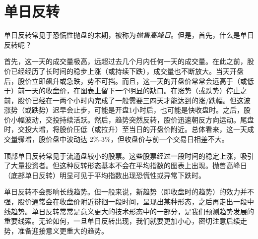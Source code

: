 \section{单日反转}
单日反转常见于恐慌性抛盘的末期，被称为\textit{抛售高峰日}。但是，首先，什么是单日反转呢？

\begin{tcolorbox}
    首先，这一天的成交量极高，远超过去几个月内任何一天的成交量。在此之前，股价已经经历了长时间的稳步上涨（或持续下跌），成交量也不断放大。当天开盘后，股价立即飙升或急跌，势不可挡。而且，这一天的开盘价常常会远高于（或低于）前一天的收盘价，在图表上留下一个明显的缺口。在涨势（或跌势）停止之前，股价已经在一两个小时内完成了一般需要三四天才能达到的涨/跌幅。但这波涨势（或跌势）迟早会止步，可能是开盘1小时后，也可能是快收盘时。之后，股价小幅波动，交投持续活跃。然后，趋势突然反转，股价迅速朝反方向运动。尾盘时，交投大增，将股价压低（或拉升）至当日的开盘价附近。总体看来，这一天成交量骤增，股价盘中波动达 2\%-3\%，但收盘价与前一个交易日相差不大。
\end{tcolorbox}

顶部单日反转常见于流通盘较小的股票。这些股票经过一段时间的稳定上涨，吸引了大量投资者。但这种反转形态基本不会在平均指数的图表上出现。抛售高峰日（底部单日反转）明显可见于平均指数出现恐慌性或异常下跌时。

单日反转不会影响长线趋势。但一般来说，新趋势（即收盘时的趋势）的效力并不强，股价通常会在收盘价附近徘徊一段时间，呈现出某种形态，之后再走出一段中线趋势。单日反转常常是意义更大的技术形态中的一部分，是我们预测趋势发展的重要线索。无论如何，一旦单日反转出现，我们就要更加小心，密切注意后续走势，准备迎接意义更重大的趋势。